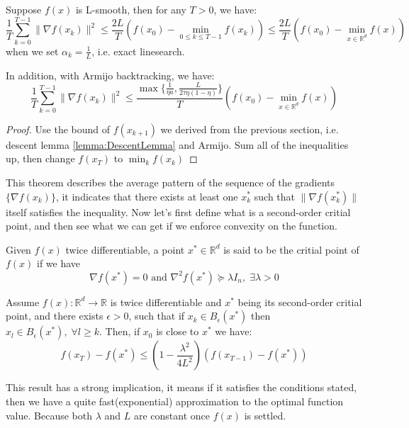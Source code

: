 \begin{theorem}
    Suppose $f(x)$ is L-smooth, then for any $T > 0$, we have:
    \begin{equation*}
        \frac{1}{T}\sum_{k=0}^{T-1}\|\nabla f(x_k) \|^2 \leq \frac{2L}{T}(f(x_0) - \min_{0\leq k \leq T-1}f(x_k)) \leq \frac{2L}{T}(f(x_0) - \min_{x \in \mathbb{R}^d}f(x)) 
    \end{equation*}
    when we set $\alpha_k = \frac{1}{L}$, i.e. exact linesearch.

    In addition, with Armijo backtracking, we have:
    \begin{equation*}
        \frac{1}{T}\sum_{k=0}^{T-1}\|\nabla f(x_k) \|^2 \leq \frac{\max \{ \frac{1}{\eta a}, \frac{L}{2\tau\eta(1-\eta)} \}}{T}(f(x_0) - \min_{x \in \mathbb{R}^d}f(x))
    \end{equation*}
\end{theorem}
\begin{proof}
    Use the bound of $f(x_{k+1})$ we derived from the previous section, i.e. descent lemma \ref{lemma:DescentLemma} and Armijo. Sum all of the inequalities up, then change $f(x_T)$ to $\min_{k}f(x_k)$
\end{proof}

This theorem describes the average pattern of the sequence of the gradients $\{ \nabla f(x_k) \}$, it indicates that there exists at least one $x_k^*$ such that $\| \nabla f(x_k^*) \|$ itself satisfies the inequality. Now let's first define what is a second-order critial point, and then see what we can get if we enforce convexity on the function. 

\begin{definition}
    Given $f(x)$ twice differentiable, a point $x^* \in \mathbb{R}^d$ is said to be the critial point of $f(x)$ if we have 
    \begin{equation*}
        \nabla f(x^*) = 0 \text{ and } \nabla^2f(x^*) \succeq \lambda I_n, \;\exists \lambda > 0
    \end{equation*}
\end{definition}

\begin{theorem}
    Assume $f(x) : \mathbb{R}^d \rightarrow \mathbb{R}$ is twice differentiable and $x^*$ being its second-order critial point, and there exists $\epsilon > 0$, such that if $x_k \in B_\epsilon(x^*)$ then $x_l \in B_\epsilon(x^*),\;\forall l \geq k$. Then, if $x_0$ is close to $x^*$ we have:
    \begin{equation*}
        f(x_T) - f(x^*) \leq (1 - \frac{\lambda^2}{4L^2})(f(x_{T-1}) - f(x^*))
    \end{equation*}
\end{theorem}

This result has a strong implication, it means if it satisfies the conditions stated, then we have a quite fast(exponential) approximation to the optimal function value. Because both $\lambda$ and $L$ are constant once $f(x)$ is settled.